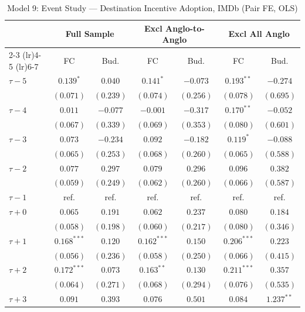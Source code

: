 \clearpage


\begin{table}[htbp]
\centering
\caption{Model 9: Event Study --- Destination Incentive Adoption, IMDb (Pair FE, OLS)}
\label{tab:model9}
\footnotesize
\begin{tabular}{l cc cc cc }
\toprule
  & \multicolumn{2}{c}{Full Sample} & \multicolumn{2}{c}{Excl Anglo-to-Anglo} & \multicolumn{2}{c}{Excl All Anglo} \\
\cmidrule(lr){2-3}
\cmidrule(lr){4-5}
\cmidrule(lr){6-7}
  & FC & Bud. & FC & Bud. & FC & Bud. \\
\midrule
$\tau-5$ & $0.139^{*}$ & $0.040$ & $0.141^{*}$ & $-0.073$ & $0.193^{**}$ & $-0.274$ \\
 & $(0.071)$ & $(0.239)$ & $(0.074)$ & $(0.256)$ & $(0.078)$ & $(0.695)$ \\[2pt]
$\tau-4$ & $0.011$ & $-0.077$ & $-0.001$ & $-0.317$ & $0.170^{**}$ & $-0.052$ \\
 & $(0.067)$ & $(0.339)$ & $(0.069)$ & $(0.353)$ & $(0.080)$ & $(0.601)$ \\[2pt]
$\tau-3$ & $0.073$ & $-0.234$ & $0.092$ & $-0.182$ & $0.119^{*}$ & $-0.088$ \\
 & $(0.065)$ & $(0.253)$ & $(0.068)$ & $(0.260)$ & $(0.065)$ & $(0.588)$ \\[2pt]
$\tau-2$ & $0.077$ & $0.297$ & $0.079$ & $0.296$ & $0.096$ & $0.382$ \\
 & $(0.059)$ & $(0.249)$ & $(0.062)$ & $(0.260)$ & $(0.066)$ & $(0.587)$ \\[2pt]
$\tau-1$ & ref. & ref. & ref. & ref. & ref. & ref. \\
$\tau+0$ & $0.065$ & $0.191$ & $0.062$ & $0.237$ & $0.080$ & $0.184$ \\
 & $(0.058)$ & $(0.198)$ & $(0.060)$ & $(0.217)$ & $(0.080)$ & $(0.346)$ \\[2pt]
$\tau+1$ & $0.168^{***}$ & $0.120$ & $0.162^{***}$ & $0.150$ & $0.206^{***}$ & $0.223$ \\
 & $(0.056)$ & $(0.236)$ & $(0.058)$ & $(0.250)$ & $(0.066)$ & $(0.415)$ \\[2pt]
$\tau+2$ & $0.172^{***}$ & $0.073$ & $0.163^{**}$ & $0.130$ & $0.211^{***}$ & $0.357$ \\
 & $(0.064)$ & $(0.271)$ & $(0.068)$ & $(0.294)$ & $(0.076)$ & $(0.535)$ \\[2pt]
$\tau+3$ & $0.091$ & $0.393$ & $0.076$ & $0.501$ & $0.084$ & $1.237^{**}$ \\

\end{tabular}
\end{table}
